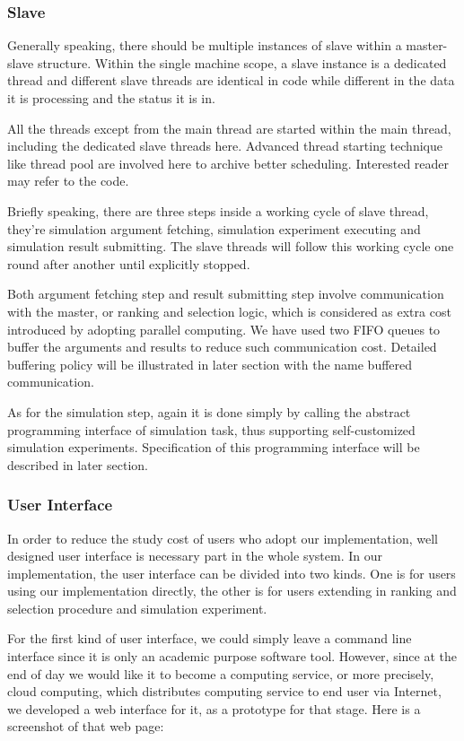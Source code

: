 \documentclass[12pt,a4paper]{report}
\begin{document}
\subsubsection{Slave}

Generally speaking, there should be multiple instances of slave within a master-slave structure. Within the single machine scope, a slave instance is a dedicated thread and different slave threads are identical in code while different in the data it is processing and the status it is in.

All the threads except from the main thread are started within the main thread, including the dedicated slave threads here. Advanced thread starting technique like thread pool are involved here to archive better scheduling. Interested reader may refer to the code.

Briefly speaking, there are three steps inside a working cycle of slave thread, they're simulation argument fetching, simulation experiment executing and simulation result submitting. The slave threads will follow this working cycle one round after another until explicitly stopped.

Both argument fetching step and result submitting step involve communication with the master, or ranking and selection logic, which is considered as extra cost introduced by adopting parallel computing. We have used two FIFO queues to buffer the arguments and results to reduce such communication cost. Detailed buffering policy will be illustrated in later section with the name buffered communication.

As for the simulation step, again it is done simply by calling the abstract programming interface of simulation task, thus supporting self-customized simulation experiments. Specification of this programming interface will be described in later section.

\subsubsection{User Interface}

In order to reduce the study cost of users who adopt our implementation, well designed user interface is necessary part in the whole system. In our implementation, the user interface can be divided into two kinds. One is for users using our implementation directly, the other is for users extending in ranking and selection procedure and simulation experiment.

For the first kind of user interface, we could simply leave a command line interface since it is only an academic purpose software tool. However, since at the end of day we would like it to become a computing service, or more precisely, cloud computing, which distributes computing service to end user via Internet, we developed a web interface for it, as a prototype for that stage. Here is a screenshot of that web page:
\end{document}
